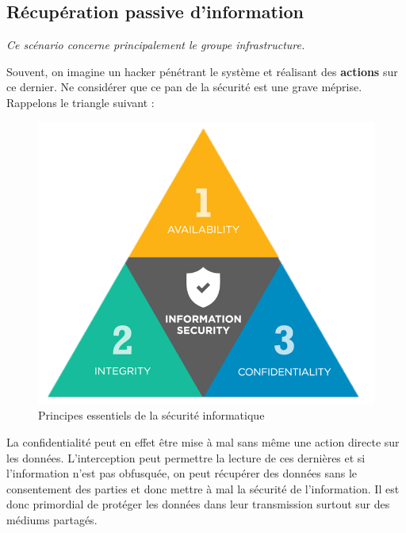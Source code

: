\documentclass[12pt]{article}
\begin{document}

\subsection{Récupération passive d'information}

\emph{Ce scénario concerne principalement le groupe infrastructure.}
\medskip

Souvent, on imagine un hacker pénétrant le système et réalisant des \textbf{actions} sur ce dernier. Ne considérer que ce pan de la sécurité est une grave méprise. Rappelons le triangle suivant :

\begin{figure}[h]
\begin{center}
\includegraphics[width=.6\textwidth]{CAI.png}
\caption{Principes essentiels de la sécurité informatique}
\end{center}
\end{figure}

La confidentialité peut en effet être mise à mal sans même une action directe sur les données. L'interception peut permettre la lecture de ces dernières et si l'information n'est pas obfusquée, on peut récupérer des données sans le consentement des parties et donc mettre à mal la sécurité de l'information. Il est donc primordial de protéger les données dans leur transmission surtout sur des médiums partagés.
\medskip
\end{document}
